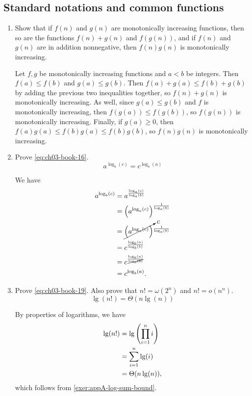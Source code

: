\documentclass[Chapter03]{subfiles}
\begin{document}
	\subsection{Standard notations and common functions}

	\begin{enumerate}[leftmargin=\labelsep]
		\item Show that if $f(n)$ and $g(n)$ are monotonically increasing functions, then so are the functions $f(n) + g(n)$ and $f(g(n))$, and if $f(n)$ and $g(n)$ are in addition nonnegative, then $f(n)g(n)$ is monotonically increasing.
		\begin{answer}
			Let $f,g$ be monotonically increasing functions and $a < b$ be integers. Then $f(a) \leq f(b)$ and $g(a) \leq g(b)$. Then $f(a) + g(a) \leq f(b) + g(b)$ by adding the previous two inequalities together, so $f(n) + g(n)$ is monotonically increasing. As well, since $g(a) \leq g(b)$ and $f$ is monotonically increasing, then $f(g(a)) \leq f(g(b))$, so $f(g(n))$ is monotonically increasing. Finally, if $g(a) \geq 0$,  then $f(a)g(a) \leq f(b)g(a) \leq f(b)g(b)$, so $f(n)g(n)$ is monotonically increasing.
		\end{answer}

		\item Prove \cref{eq:ch03-book-16}.
		\begin{equation}
			a^{\log_b(c)} = c^{\log_b(a)} \label{eq:ch03-book-16} \tag{3.16}
		\end{equation}
		\begin{answer}
			We have
			\begin{align*}
				a^{\log_b(c)} &= a^{\frac{\log_a(c)}{\log_a(b)}}\\
					&= \qty(a^{\log_a(c)})^{\frac{1}{\log_a(b)}}\\
					&= \cancelto{c}{\qty(a^{\log_a(c)})}^{\frac{1}{\log_a(b)}}\\
					&= c^{\frac{\log_b(a)}{\log_b(b)}}\\
					&= c^{\frac{\log_b(a)}{\cancel{\log_b(b)}}}\\
					&= c^{\log_b(a)}.
			\end{align*}
		\end{answer}

		\item Prove \cref{eq:ch03-book-19}. Also prove that $n! = \omega(2^n)$ and $n! = o(n^n)$.
		\begin{equation}
			\lg(n!) = \Theta(n \lg(n)) \label{eq:ch03-book-19} \tag{3.19}
		\end{equation}
		\begin{answer}
			By properties of logarithms, we have
			\begin{align*}
				\lg(n!) &= \lg \qty(\prod_{i = 1}^n i)\\
					&= \sum_{i = 1}^n \lg(i)\\
					&= \Theta(n \lg(n)),
			\end{align*}
			which follows from \cref{exer:appA-log-sum-bound}.
		\end{answer}


\end{enumerate}
\end{document}

